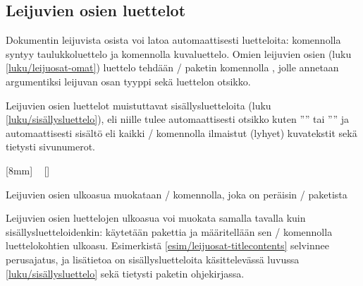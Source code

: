 \subsection{Leijuvien osien luettelot}
\label{luku/leijuosat-luettelot}

Dokumentin leijuvista osista voi latoa automaattisesti luetteloita:
komennolla  syntyy taulukkoluettelo ja komennolla
 kuvaluettelo. Omien leijuvien osien (luku
\ref{luku/leijuosat-omat}) luettelo tehdään \-/
paketin komennolla , jolle annetaan argumentiksi
leijuvan osan tyyppi sekä luettelon otsikko.

\begin{koodilohkosis}
\listoftables                  %
\listoffigures                 %
\end{koodilohkosis}

Leijuvien osien luettelot muistuttavat sisällysluetteloita (luku
\ref{luku/sisällysluettelo}), eli niille tulee automaattisesti otsikko
kuten ''\listtablename'' tai ''\listfigurename'' ja automaattisesti
sisältö eli kaikki \-/ komennolla ilmaistut (lyhyet)
kuvatekstit sekä tietysti sivunumerot.

\begin{esimerkki*}

\begin{koodilohko}
[8mm]                                       %
{\addvspace{3bp}\rmfamily\small}            %
{\contentslabel{8mm}}                       %
{}                                          %
{~\small{}\contentspage}   %
[]                                          %
\end{koodilohko}
  \caption{Leijuvien osien ulkoasua muokataan \-/
    komennolla, joka on peräisin \-/ paketista}
  \label{esim/leijuosat-titlecontents}
\end{esimerkki*}

Leijuvien osien luettelojen ulkoasua voi muokata samalla tavalla kuin
sisällysluetteloidenkin: käytetään pakettia
 ja määritellään sen
\-/ komennolla luettelokohtien ulkoasu.
Esimerkistä \ref{esim/leijuosat-titlecontents} selvinnee perusajatus, ja
lisätietoa on sisällysluetteloita käsittelevässä luvussa
\ref{luku/sisällysluettelo} sekä tietysti paketin ohjekirjassa.

